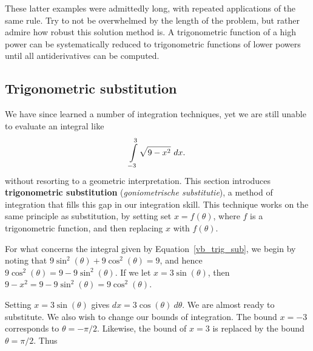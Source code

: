 These latter examples were admittedly long, with repeated applications of the same rule. Try to not be overwhelmed by the length of the problem, but rather admire how robust this solution method is. A trigonometric function of a high power can be systematically reduced to trigonometric functions of lower powers until all antiderivatives can be computed. 

\subsection{Trigonometric substitution}\label{sec:trig_sub}

\ifcourse
	\checkoddpage
{}
 \fi
We have since learned a number of integration techniques, yet we are still unable to evaluate an integral like
\begin{equation}
\displaystyle\int\limits_{-3}^3\sqrt{9-x^2}\ dx.
\label{vb_trig_sub}
\end{equation}
 without resorting to a geometric interpretation. This section introduces \textbf{trigonometric substitution} (\textit{goniometrische substitutie}), a method of integration that fills this gap in our integration skill. This technique works on the same principle as substitution, by setting set $x=f(\theta)$, where $f$ is a trigonometric function, and then replacing $x$ with $f(\theta)$.
  

For what concerns the integral given by Equation~\eqref{vb_trig_sub}, we begin by noting that $9\sin^2(\theta) + 9\cos^2(\theta) = 9$, and hence $9\cos^2(\theta) = 9-9\sin^2(\theta)$. If we let $x=3\sin(\theta)$, then $9-x^2 = 9-9\sin^2(\theta) = 9\cos^2(\theta)$. 

Setting $x=3\sin(\theta)$ gives  $dx = 3\cos(\theta)\ d\theta$. We are almost ready to substitute. We also wish to change our bounds of integration. The bound $x=-3$ corresponds to $\theta = -\pi/2$. Likewise, the bound of $x=3$ is replaced by the bound $\theta = \pi/2$. Thus

